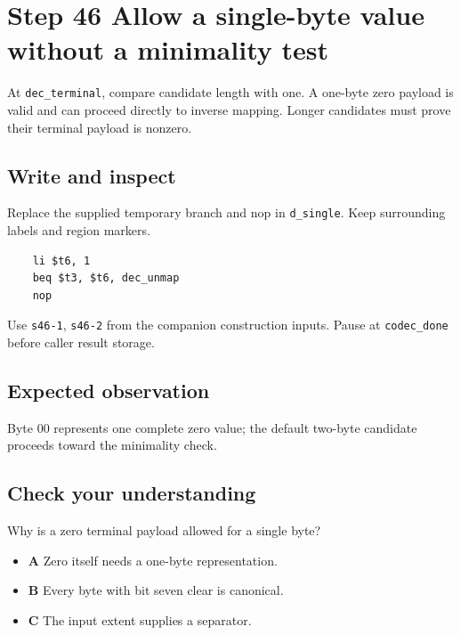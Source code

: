 \section{Step 46 Allow a single-byte value without a minimality test}\label{delta-s46}

At \texttt{dec\_terminal}, compare candidate length with one. A one-byte zero payload is valid and can proceed directly to inverse mapping. Longer candidates must prove their terminal payload is nonzero.

\subsection{Write and inspect}
Replace the supplied temporary branch and nop in \texttt{d\_single}. Keep surrounding labels and region markers.

\begin{verbatim}
    li $t6, 1
    beq $t3, $t6, dec_unmap
    nop
\end{verbatim}
Use \texttt{s46-1}, \texttt{s46-2} from the companion construction inputs. Pause at \texttt{codec\_done} before caller result storage.

\subsection{Expected observation}
Byte 00 represents one complete zero value; the default two-byte candidate proceeds toward the minimality check.

\subsection{Check your understanding}
Why is a zero terminal payload allowed for a single byte?

\begin{itemize}
  \item \textbf{A} Zero itself needs a one-byte representation.
  \item \textbf{B} Every byte with bit seven clear is canonical.
  \item \textbf{C} The input extent supplies a separator.
\end{itemize}
